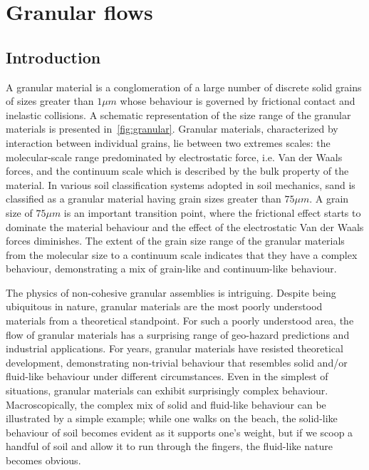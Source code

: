 \chapter{Granular flows}

\ifpdf
    \graphicspath{{Chapter2/figs/raster/}{Chapter2/figs/pdf/}{Chapter2/figs/}}
\else
    \graphicspath{{Chapter2/figs/vector/}{Chapter2/figs/}}
\fi

\section{Introduction}

A granular material is a conglomeration of a large number of discrete solid 
grains of sizes greater than $1\mu m$ whose behaviour is governed by 
frictional contact and inelastic collisions. A schematic representation of the 
size range of the granular materials is presented in~\cref{fig:granular}. 
Granular materials, characterized by interaction between individual grains, 
lie between two extremes scales: the molecular-scale range predominated by 
electrostatic force, i.e. Van der Waals forces, and the continuum scale which 
is described by the bulk property of the material. In various soil 
classification systems adopted in soil mechanics, sand is classified as a 
granular material having grain sizes greater than $75\mu m$. A grain size 
of $75\mu m$ is an important transition point, where the frictional effect 
starts to dominate the material behaviour and the effect of the electrostatic 
Van der Waals forces diminishes. The extent of the grain size range of the 
granular materials from the molecular size to a continuum scale indicates that 
they have a complex behaviour, demonstrating a mix of grain-like and 
continuum-like behaviour.

The physics of non-cohesive granular assemblies is 
intriguing. Despite being ubiquitous in nature, granular materials are the most 
poorly understood materials from a theoretical standpoint. For such a poorly 
understood area, the flow of granular materials has a surprising range of 
geo-hazard predictions and industrial applications. For years, granular 
materials have resisted theoretical development, demonstrating non-trivial 
behaviour that resembles solid and/or fluid-like behaviour under different 
circumstances. Even in the simplest of situations, granular materials can 
exhibit surprisingly complex behaviour. Macroscopically, the complex mix of 
solid and fluid-like behaviour can be illustrated by a simple example; while 
one walks on the beach, the solid-like behaviour of soil becomes evident as it 
supports one's weight, but if we scoop a handful of soil and allow it to run 
through the fingers, the fluid-like nature becomes obvious.

